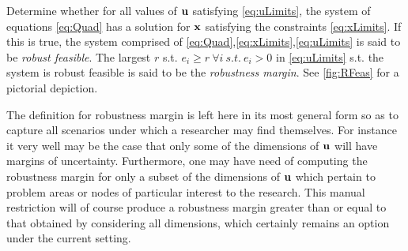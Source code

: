 \begin{cdef}
\label{RobustDef}
Determine whether for all values of $\bold u$ satisfying \eqref{eq:uLimits}, the system of equations \eqref{eq:Quad} has a solution for $\bold x$ satisfying the constraints \eqref{eq:xLimits}. 
If this is true, the system comprised of \eqref{eq:Quad},\eqref{eq:xLimits},\eqref{eq:uLimits} is said to be \emph{robust feasible}. 
The largest $r$ s.t. $e_i\geq r \ \forall i \ s.t. \ e_i>0$ in \eqref{eq:uLimits} s.t. the system is robust feasible is said to be the \emph{robustness margin}. 
See \cref{fig:RFeas} for a pictorial depiction. 
\end{cdef}

The definition for robustness margin is left here in its most general form so as to capture all scenarios under which a researcher may find themselves. 
For instance it very well may be the case that only some of the dimensions of $\bold u$ will have margins of uncertainty. 
Furthermore, one may have need of computing the robustness margin for only a subset of the dimensions of $\bold u$ which pertain to problem areas or nodes of particular interest to the research. 
This manual restriction will of course produce a robustness margin greater than or equal to that obtained by considering all dimensions, which certainly remains an option under the current setting. 

